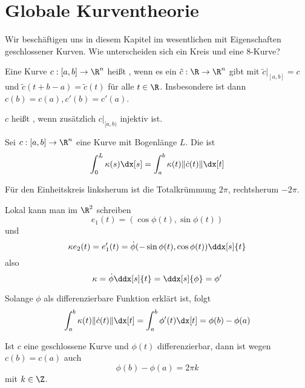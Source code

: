 \chapter{Globale Kurventheorie}



Wir beschäftigen uns in diesem Kapitel im wesentlichen mit Eigenschaften geschlossener Kurven.
Wie unterscheiden sich ein Kreis und eine 8-Kurve?

\begin{df}
	Eine Kurve $c: [a,b] \to \R^n$ heißt , wenn es ein $\tilde c: \R \to \R^n$ gibt mit $\tilde c \big|_{[a,b]} = c$ und $\tilde c(t+b-a) = \tilde c(t)$ für alle $t \in \R$.
	Insbesondere ist dann $c(b) = c(a), c'(b) = c'(a)$.

	$c$ heißt , wenn zusätzlich $c|_{[a,b)}$ injektiv ist.
\end{df}

\begin{df}
	Sei $c: [a,b] \to \R^n$ eine Kurve mit Bogenlänge $L$.
	Die  ist
	\[
		\int_0^L \kappa(s) \dx[s]
		= \int_a^b \kappa(t) \|\dot c(t)\| \dx[t]
	\]
\end{df}

\begin{ex}
	Für den Einheitskreis linksherum ist die Totalkrümmung $2\pi$, rechtsherum $-2\pi$.
\end{ex}

Lokal kann man im $\R^2$ schreiben
\[
	e_1(t) = (\cos \phi(t), \sin \phi(t))
\]
und
\[
	\kappa e_2(t)
	= e_1'(t)
	= \dot \phi (-\sin \phi(t), \cos \phi(t)) \ddx[s]{t}
\]
also
\[
	\kappa = \dot \phi \ddx[s]{t} = \ddx[s]{\phi} = \phi'
\]

\begin{kor}
	Solange $\phi$ als differenzierbare Funktion erklärt ist, folgt
	\[
		\int_a^b \kappa(t) \|\dot c(t)\| \dx[t]
		= \int_a^b \phi'(t) \dx[t]
		= \phi(b) - \phi(a)
	\]
\end{kor}

Ist $c$ eine geschlossene Kurve und $\phi(t)$ differenzierbar, dann ist wegen $c(b) = c(a)$ auch
\[
	\phi(b) - \phi(a) = 2\pi k
\]
mit $k \in \Z$.

